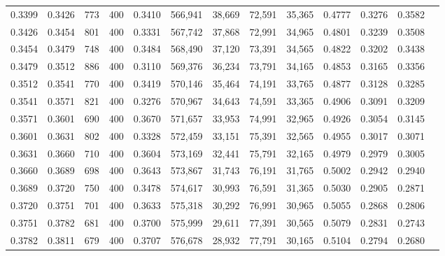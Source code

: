 \begin{tabular}{rrrrrrrrrrrrr}
0.3399 & 0.3426 &    773 &   400 &                                     0.3410 & 566,941 &  38,669 &  72,591 &  35,365 & 0.4777 & 0.3276 & 0.3582 \\
0.3426 & 0.3454 &    801 &   400 &                                     0.3331 & 567,742 &  37,868 &  72,991 &  34,965 & 0.4801 & 0.3239 & 0.3508 \\
0.3454 & 0.3479 &    748 &   400 &                                     0.3484 & 568,490 &  37,120 &  73,391 &  34,565 & 0.4822 & 0.3202 & 0.3438 \\
0.3479 & 0.3512 &    886 &   400 &                                     0.3110 & 569,376 &  36,234 &  73,791 &  34,165 & 0.4853 & 0.3165 & 0.3356 \\
0.3512 & 0.3541 &    770 &   400 &                                     0.3419 & 570,146 &  35,464 &  74,191 &  33,765 & 0.4877 & 0.3128 & 0.3285 \\
0.3541 & 0.3571 &    821 &   400 &                                     0.3276 & 570,967 &  34,643 &  74,591 &  33,365 & 0.4906 & 0.3091 & 0.3209 \\
0.3571 & 0.3601 &    690 &   400 &                                     0.3670 & 571,657 &  33,953 &  74,991 &  32,965 & 0.4926 & 0.3054 & 0.3145 \\
0.3601 & 0.3631 &    802 &   400 &                                     0.3328 & 572,459 &  33,151 &  75,391 &  32,565 & 0.4955 & 0.3017 & 0.3071 \\
0.3631 & 0.3660 &    710 &   400 &                                     0.3604 & 573,169 &  32,441 &  75,791 &  32,165 & 0.4979 & 0.2979 & 0.3005 \\
0.3660 & 0.3689 &    698 &   400 &                                     0.3643 & 573,867 &  31,743 &  76,191 &  31,765 & 0.5002 & 0.2942 & 0.2940 \\
0.3689 & 0.3720 &    750 &   400 &                                     0.3478 & 574,617 &  30,993 &  76,591 &  31,365 & 0.5030 & 0.2905 & 0.2871 \\
0.3720 & 0.3751 &    701 &   400 &                                     0.3633 & 575,318 &  30,292 &  76,991 &  30,965 & 0.5055 & 0.2868 & 0.2806 \\
0.3751 & 0.3782 &    681 &   400 &                                     0.3700 & 575,999 &  29,611 &  77,391 &  30,565 & 0.5079 & 0.2831 & 0.2743 \\
0.3782 & 0.3811 &    679 &   400 &                                     0.3707 & 576,678 &  28,932 &  77,791 &  30,165 & 0.5104 & 0.2794 & 0.2680 \\

\end{tabular}
